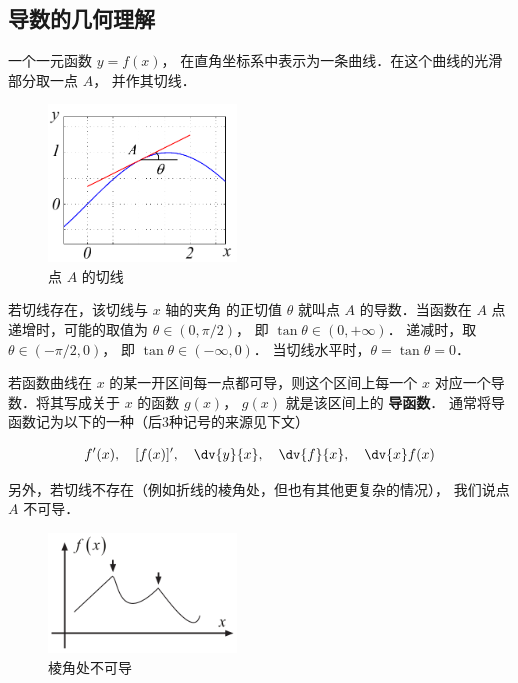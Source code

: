 

\subsection{导数的几何理解}

一个一元函数 $y = f(x)$， 在直角坐标系中表示为一条曲线．在这个曲线的光滑部分取一点 $A$， 并作其切线．

\begin{figure}[ht]
\centering
\includegraphics[width=5cm]{./figures/Der1.pdf}
\caption{点 $A$ 的切线}
\end{figure}


若切线存在，该切线与 $x$ 轴的夹角 的正切值 $\theta$ 就叫点 $A$ 的导数．当函数在 $A$ 点递增时，可能的取值为 $\theta  \in (0,\pi/2)$， 即 $\tan \theta  \in (0, + \infty)$． 递减时，取 $\theta  \in (-\pi/2,0)$， 即 $\tan \theta  \in (-\infty ,0)$． 当切线水平时，$\theta  = \tan \theta  = 0$． 

若函数曲线在 $x$ 的某一开区间每一点都可导，则这个区间上每一个 $x$ 对应一个导数．将其写成关于 $x$ 的函数 $g(x)$，  $g(x)$  就是该区间上的 \textbf{导函数}． 通常将导函数记为以下的一种（后3种记号的来源见下文）

\begin{equation}\label{Der_eq1}
f'(x),\quad [f(x)]',\quad \dv{y}{x},\quad \dv{f}{x},\quad \dv{x}f(x)
\end{equation}


另外，若切线不存在（例如折线的棱角处，但也有其他更复杂的情况）， 我们说点 $A$ 不可导．

\begin{figure}[ht]
\centering
\includegraphics[width=5cm]{./figures/Der3.pdf}
\caption{棱角处不可导}
\end{figure}


